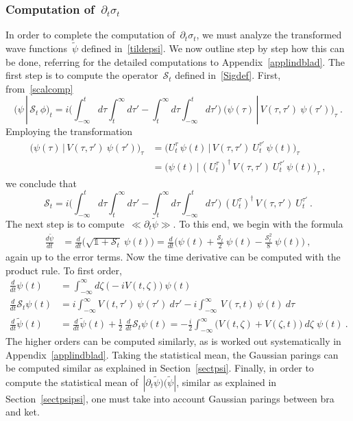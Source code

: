 \documentclass[reqno,11pt]{amsart}
\numberwithin{equation}{section}
\newcommand{\beq}{\begin{equation}}
\newcommand{\eeq}{\end{equation}}
\newcommand{\bbra}{\mathopen{\ll}}
\newcommand{\kket}{\mathclose{\gg}}
\newcommand{\1}{\mathds{1}}
\newcommand{\Sig}{\mathscr{S}}
\begin{document}
{\subsubsection{Computation of~$\partial_t \sigma_t$}
In order to complete the computation of~$\partial_t \sigma_t$, we must analyze the
transformed wave functions~$\tilde{\psi}$ defined in~\eqref{tildepsi}.
We now outline step by step how this can be done, referring for the detailed computations to
Appendix~\ref{applindblad}.
The first step is to compute the operator~$\Sig_t$ defined in~\eqref{Sigdef}. First, from~\eqref{scalcomp}
\[ \big( \psi \,|\, \Sig_t\, \phi \big)_t =
i \bigg( \int_{-\infty}^t \!\!\!\!\!d\tau \int_t^\infty \!\!\!\!\!d\tau' \!-\! \int_t^\infty \!\!\!\!\!d\tau \int_{-\infty}^t \!\!\!\!\!d\tau' \bigg) \: \big( \psi(\tau) \,|\, V(\tau,\tau') \:\psi(\tau') \big)_\tau \:. \]
Employing the transformation
\begin{align*}
\big( \psi(\tau) \,|\, V(\tau,\tau') \:\psi(\tau') \big)_\tau
&= \big( U^\tau_t \,\psi(t) \,|\, V(\tau,\tau') \:U^{\tau'}_t\, \psi(t) \big)_\tau \\
&= \big( \psi(t) \,|\, (U^\tau_t)^\dagger \,V(\tau,\tau') \:U^{\tau'}_t\, \psi(t) \big)_\tau \:,
\end{align*}
we conclude that
\beq \label{Sform}
\Sig_t = i \bigg( \int_{-\infty}^t \!\!\!\!\!d\tau \int_t^\infty \!\!\!\!\!d\tau' \!-\! \int_t^\infty \!\!\!\!\!d\tau \int_{-\infty}^t \!\!\!\!\!d\tau' \bigg) \: (U^\tau_t)^\dagger \,V(\tau,\tau') \:U^{\tau'}_t \:.
\eeq
The next step is to compute~$\bbra \partial_t \tilde{\psi} \kket$. To this end, we begin with the formula
\begin{align*}
\frac{d \tilde{\psi}}{dt}  &= \frac{d}{dt} \Big( \sqrt{\1 + \Sig_t}\: \psi(t) \Big)
= \frac{d}{dt} \Big( \psi(t) + \frac{\Sig_t}{2}\: \psi(t) - \frac{\Sig_t^2}{8} \: \psi(t) \Big) \:,
\end{align*}
again up to the error terms.
Now the time derivative can be computed with the product rule. To first order,
\begin{align*}
\frac{d}{dt} \psi(t) &= 
\int_{-\infty}^\infty d\zeta\: \big(-i V(t, \zeta) \big)\: \psi(t) \\
\frac{d}{dt} \Sig_t \psi(t) &= i \int_{-\infty}^\infty V(t,\tau') \:\psi(\tau')\: d\tau' - i \int_{-\infty}^\infty \,V(\tau,t)
\:\psi(t)\: d\tau \\
\frac{d}{dt} \tilde{\psi}(t) &= \frac{d}{dt} \tilde{\psi}(t) + \frac{1}{2}\: \frac{d}{dt}  \Sig_t \psi(t)
= -\frac{i}{2} \int_{-\infty}^\infty \big( V(t, \zeta) + V(\zeta,t) \big)\:d\zeta\; \psi(t) \:.
\end{align*}
The higher orders can be computed similarly, as is worked out systematically in Appendix~\ref{applindblad}.
Taking the statistical mean, the Gaussian parings can be computed similar as explained in Section~\ref{sectpsi}.
Finally, in order to compute the statistical mean of~$|\partial_t \tilde{\psi} )( \tilde{\psi}|$,
similar as explained in Section~\ref{sectpsipsi}, one must
take into account Gaussian parings between bra and ket.

}
\end{document}
